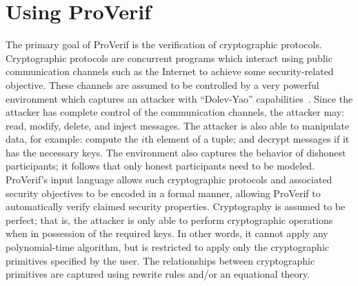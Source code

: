 \documentclass{book}
\begin{document}

%
%





\chapter{Using ProVerif}\label{sec:.pv}

The primary goal of ProVerif is the verification of cryptographic protocols.
Cryptographic protocols are concurrent programs which interact using public communication channels such as the Internet to achieve some security-related objective. These channels are assumed to be controlled by a very powerful environment which captures an attacker with ``Dolev-Yao'' capabilities~\cite{Dolev83}. Since the attacker has complete control of the communication channels, the attacker may: read, modify, delete, and inject messages. The attacker is also able to manipulate data, for example: compute the $i$th element of a tuple; and decrypt messages if it has the necessary keys. The environment also captures the behavior of dishonest participants; it follows that only honest participants need to be modeled. ProVerif's input language allows such cryptographic protocols and associated security objectives to be encoded in a formal manner, allowing ProVerif to automatically verify claimed security properties. Cryptography is assumed to be perfect; that is, the attacker is only able to perform cryptographic operations when in possession of the required keys. In other words, it cannot apply any polynomial-time algorithm, but is restricted to apply only the cryptographic primitives specified by the user. The relationships between cryptographic primitives are captured using rewrite rules and/or an equational theory.
\end{document}
